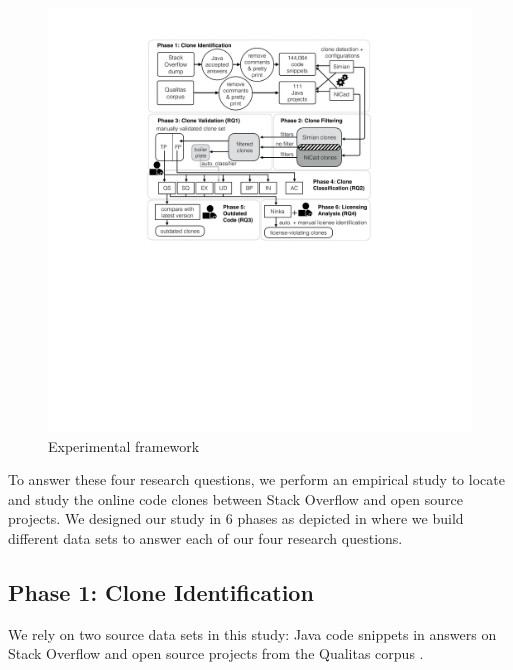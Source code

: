 \documentclass[sigconf,review, anonymous]{acmart}
\begin{document}
\begin{figure}
  \centering
  \includegraphics[width=\linewidth]{exp_framework_new}
  \caption{Experimental framework}
  \label{fig:exp_framework}
\end{figure}

To answer these four research questions, we perform an empirical study to
locate and study the online code clones between Stack Overflow and open source
projects. 
%
%
We designed our study in 6 phases as depicted in  where
we build different data sets to answer each of our four research
questions. 

\subsection{Phase 1: Clone Identification}

We rely on two source data sets in this study: Java code snippets in answers
on Stack Overflow and open source projects from the Qualitas corpus
\cite{QualitasCorpus}.
\end{document}
